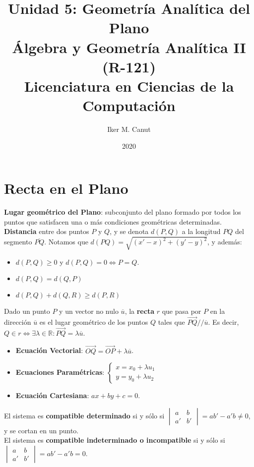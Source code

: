 \documentclass[11pt,a4paper]{article}
\author{Iker M. Canut}
\title{Unidad 5: Geometr\'ia Anal\'itica del Plano\\ \'Algebra y Geometr\'ia Anal\'itica II (R-121)\\Licenciatura en Ciencias de la Computaci\'on}
\date{2020}
\begin{document}
\maketitle
\newpage

\section{Recta en el Plano}

\textbf{Lugar geom\'etrico del Plano}: subconjunto del plano formado por todos los puntos que satisfacen una o m\'as condiciones geom\'etricas determinadas.\\

\textbf{Distancia} entre dos puntos $P$ y $Q$, y se denota $d(P,Q)$ a la longitud $PQ$ del segmento $\overline{PQ}$. Notamos que $d(PQ) = \sqrt{(x'-x)^2 + (y' - y)^2}$, y adem\'as:
\begin{itemize}
\itemsep-0.3em
\item $d(P,Q) \geq 0$ y $d(P,Q) = 0 \iff P = Q$.
\item $d(P,Q) = d(Q,P)$
\item $d(P,Q) + d(Q,R) \geq d(P,R)$\\
\end{itemize}

Dado un punto $P$ y un vector no nulo $\overline{u}$, la \textbf{recta} $r$ que pasa por $P$ en la direcci\'on $\overline{u}$ es el lugar geom\'etrico de los puntos $Q$ tales que $\overrightarrow{PQ} // \overline{u}$. Es decir, $Q \in r \iff \exists \lambda \in \mathbb{R} : \overrightarrow{PQ} = \lambda \overline{u}$.
\begin{itemize}
\itemsep-0.3em
\item \textbf{Ecuaci\'on Vectorial}: $\overrightarrow{OQ} = \overrightarrow{OP} + \lambda \overline{u}$.
\item \textbf{Ecuaciones Param\'etricas}: $\left\{ \begin{array}{l} x = x_0 + \lambda u_1 \\ y = y_0 + \lambda u_2 \end{array} \right.$
\item \textbf{Ecuaci\'on Cartesiana}: $ax + by + c = 0$.
\end{itemize}

El sistema es \textbf{compatible determinado} si y s\'olo si $\begin{vmatrix} a & b \\ a' & b' \end{vmatrix} = ab' - a'b \not = 0$, y se cortan en un punto.\\
El sistema es \textbf{compatible indeterminado o incompatible} si y s\'olo si $\begin{vmatrix} a & b \\ a' & b' \end{vmatrix} = ab' - a'b = 0$.\\
\end{document}
